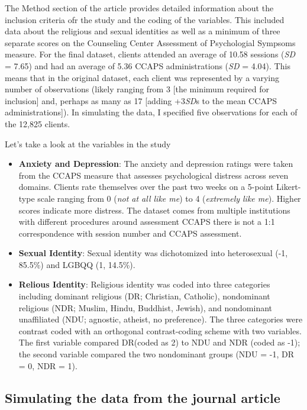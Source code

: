 \documentclass[
  11pt,
]{book}
\begin{document}
The Method section of the article provides detailed information about the inclusion criteria ofr the study and the coding of the variables. This included data about the religious and sexual identities as well as a minimum of three separate scores on the Counseling Center Assessment of Psychologial Sympsoms \citep[CCAPS,][]{locke_development_2012} measure. For the final dataset, clients attended an average of 10.58 sessions (\emph{SD} = 7.65) and had an average of 5.36 CCAPS administrations (\emph{SD} = 4.04). This means that in the original dataset, each client was represented by a varying number of observations (likely ranging from 3 {[}the minimum required for inclusion{]} and, perhaps as many as 17 {[}adding +3\emph{SD}s to the mean CCAPS administrations{]}). In simulating the data, I specified five observations for each of the 12,825 clients.

Let's take a look at the variables in the study

\begin{itemize}
\item
  \textbf{Anxiety and Depression}: The anxiety and depression ratings were taken from the CCAPS measure \citep{locke_development_2012} that assesses psychological distress across seven domains. Clients rate themselves over the past two weeks on a 5-point Likert-type scale ranging from 0 (\emph{not at all like me}) to 4 (\emph{extremely like me}). Higher scores indicate more distress. The dataset comes from multiple institutions with different procedures around assessment CCAPS there is not a 1:1 correspondence with session number and CCAPS assessment.
\item
  \textbf{Sexual Identity}: Sexual identity was dichotomized into heterosexual (-1, 85.5\%) and LGBQQ (1, 14.5\%).
\item
  \textbf{Relious Identity}: Religious identity was coded into three categories including dominant religious (DR; Christian, Catholic), nondominant religious (NDR; Muslim, Hindu, Buddhist, Jewish), and nondominant unaffiliated (NDU; agnostic, atheist, no preference). The three categories were contrast coded with an orthogonal contrast-coding scheme with two variables. The first variable compared DR(coded as 2) to NDU and NDR (coded as -1); the second variable compared the two nondominant groups (NDU = -1, DR = 0, NDR = 1).
\end{itemize}

\hypertarget{simulating-the-data-from-the-journal-article-1}{%
\subsection{Simulating the data from the journal article}\label{simulating-the-data-from-the-journal-article-1}}
\end{document}
